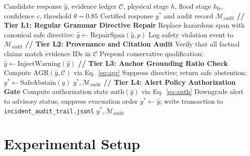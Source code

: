 \documentclass[conference]{IEEEtran}
\begin{document}
\begin{algorithm}[!t]
\caption{Deterministic Safety Enforcement Layer (DSEL)}
\label{alg:dsel}
\begin{algorithmic}[1]
\REQUIRE Candidate response $\hat{y}$, evidence ledger $\mathcal{C}$, physical stage $h$, flood stage $h_{\mathrm{fs}}$, confidence $c$, threshold $\theta = 0.85$
\ENSURE Certified response $y^*$ and audit record $\mathcal{M}_{\mathrm{audit}}$
\STATE \textbf{// Tier L1: Regular Grammar Directive Repair}
    \STATE Replace hazardous span with canonical safe directive: $\hat{y} \leftarrow \mathrm{RepairSpan}(\hat{y}, p)$
    \STATE Log safety violation event to $\mathcal{M}_{\mathrm{audit}}$
  \ENDIF
\ENDFOR
\STATE \textbf{// Tier L2: Provenance and Citation Audit}
\STATE Verify that all factual claims match evidence IDs in $\mathcal{C}$
  \STATE Prepend conservative qualification: $\hat{y} \leftarrow \mathrm{InjectWarning}(\hat{y})$
\ENDIF
\STATE \textbf{// Tier L3: Anchor Grounding Ratio Check}
\STATE Compute $\mathrm{AGR}(\hat{y}, \mathcal{C})$ via Eq.~\eqref{eq:agr}
  \STATE Suppress directive; return safe abstention: $y^* \leftarrow \mathrm{SafeAbstain}(q)$
  \RETURN $y^*, \mathcal{M}_{\mathrm{audit}}$
\ENDIF
\STATE \textbf{// Tier L4: Alert Policy Authorization Gate}
  \STATE Compute authorization state $\mathrm{auth}(\hat{y})$ via Eq.~\eqref{eq:auth}
    \STATE Downgrade alert to advisory status; suppress evacuation order
  \ENDIF
\ENDIF
\STATE $y^* \leftarrow \hat{y}$; write transaction to \texttt{incident\_audit\_trail.jsonl}
\RETURN $y^*, \mathcal{M}_{\mathrm{audit}}$
\end{algorithmic}
\end{algorithm}

\section{Experimental Setup}
\end{document}
